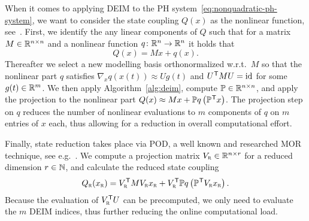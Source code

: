 When it comes to applying \ac{DEIM} to the \ac{PH} system~\eqref{eq:nonquadratic-ph-system}, we want to consider the state coupling $Q(x)$ as the nonlinear function, see~\cite[Section~3]{Chaturantabut2016}.
First, we identify the any linear components of $Q$ such that for a matrix $M \in \mathbb{R}^{n \times n}$ and a nonlinear function $q \colon \mathbb{R}^n \to \mathbb{R}^n$ it holds that
\begin{equation}\label{eq:deim-decomposition}
    Q(x) = M x + q(x).
\end{equation}
Thereafter we select a new modelling basis orthonormalized w.r.t.\ $M$ so that the nonlinear part $q$ satisfies $\nabla_x q(x(t)) \approx U g(t)$ and $U^{\mkern1mu \mathsf{T}} M U = \text{id}_{}$ for some $g(t) \in \mathbb{R}^m$.
We then apply Algorithm~\ref{alg:deim}, compute $\mathbb{P} \in \mathbb{R}^{n \times n}$, and apply the projection to the nonlinear part $Q(x) \approx M x + \mathbb{P} q\left( \mathbb{P}^{\mkern1mu \mathsf{T}} x \right)$.
The projection step on $q$ reduces the number of nonlinear evaluations to $m$ components of $q$ on $m$ entries of $x$ each, thus allowing for a reduction in overall computational effort.

Finally, state reduction takes place via \ac{POD}, a well known and researched \ac{MOR} technique, see e.g.~\cite{Pinnau2008}.
We compute a projection matrix $V_{\textnormal{\scshape r}} \in \mathbb{R}^{n \times r}$ for a reduced dimension $r \in \mathbb{N}$, and calculate the reduced state coupling
\begin{equation*}
    Q_{\textnormal{\scshape r}}(x_{\textnormal{\scshape r}}) = V_{\textnormal{\scshape r}}^{\mkern1mu \mathsf{T}} M V_{\textnormal{\scshape r}} x_{\textnormal{\scshape r}} + V_{\textnormal{\scshape r}}^{\mkern1mu \mathsf{T}}  \mathbb{P} q\left( \mathbb{P}^{\mkern1mu \mathsf{T}} V_{\textnormal{\scshape r}} x_{\textnormal{\scshape r}} \right).
\end{equation*}
Because the evaluation of $V_{\textnormal{\scshape r}}^{\mkern1mu \mathsf{T}} U$ can be precomputed, we only need to evaluate the $m$ \ac{DEIM} indices, thus further reducing the online computational load.
